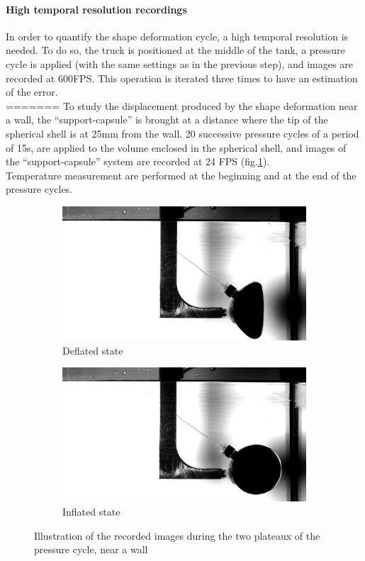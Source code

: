 \paragraph{High temporal resolution recordings}
In order to quantify the shape deformation cycle, a high temporal resolution is needed. To do so, the truck is positioned at the middle of the tank, a pressure cycle is applied (with the same settings as in the previous step), and images are recorded at 600FPS. This operation is iterated three times to have an estimation of the error. \\
=======
To study the displacement produced by the shape deformation near a wall, the "`support-capsule"' is brought at a distance where the tip of the spherical shell is at 25mm from the wall. 20 successive pressure cycles of a period of 15s, are applied to the volume enclosed in the spherical shell, and images of the "`support-capsule"' system are recorded at 24 FPS (fig.\ref{fig:illustration_frictionless_rail_wall}).\\
Temperature measurement are performed at the beginning and at the end of the pressure cycles.
\begin{figure}[H]%
	\centering%
	 \begin{subfigure}[h]{0.48\textwidth}%
        \includegraphics[width=\linewidth]{figures/Chapter_1/cycles_pp_00220.png}%
        \caption{Deflated state}%
    \end{subfigure}%
    \begin{subfigure}[h]{0.48\textwidth}%
        \includegraphics[width=\linewidth]{figures/Chapter_1/cycles_pp_00001.png}%
        \caption{Inflated state}%
    \end{subfigure}%
		\caption{Illustration of the recorded images during the two plateaux of the pressure cycle, near a wall}
		\label{fig:illustration_frictionless_rail_wall}
\end{figure}
